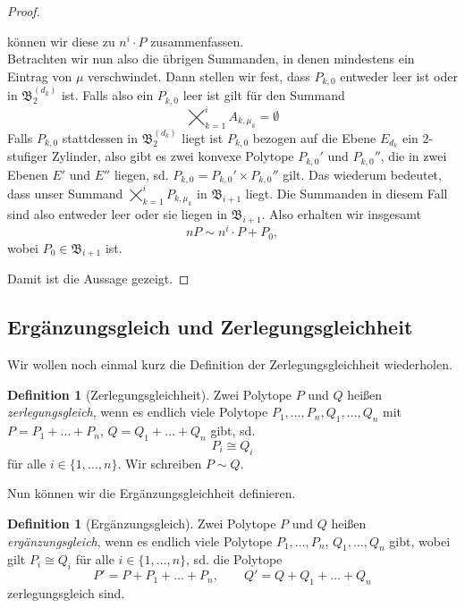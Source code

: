 \documentclass[11pt,titlepage]{article}
\theoremstyle{definition}
\newtheorem{definition}[theorem]{Definition}
\theoremstyle{remark}
\begin{document}
\begin{proof}
\begin{enumerate}
			können wir diese zu $n^i \cdot P$ zusammenfassen. \\
			Betrachten wir nun also die übrigen Summanden, in denen mindestens 
			ein Eintrag von $\mu$ verschwindet. Dann stellen wir fest, dass 
			$P_{k,0}$ entweder leer ist oder in $\mathfrak{B}_2^{(d_k)}$ ist. 
			Falls also ein $P_{k,0}$ leer ist gilt für den Summand
			\[\bigtimes_{k=1}^i A_{k,\mu_k}=\emptyset\]
			Falls $P_{k,0}$ stattdessen in $\mathfrak{B}_2^{(d_k)}$ liegt 
			ist $P_{k,0}$ bezogen auf die Ebene $E_{d_k}$ ein $2$-stufiger 
			Zylinder, also gibt es zwei konvexe Polytope $P_{k,0}'$ 
			und $P_{k,0}''$, die in zwei Ebenen $E'$ und $E''$ liegen, sd. 
			$P_{k,0}=P_{k,0}'\times P_{k,0}''$ gilt. 
			Das wiederum bedeutet, dass unser Summand 
			$\bigtimes_{k=1}^i P_{k,\mu_k}$ in $\mathfrak{B}_{i+1}$ liegt. 
			Die Summanden in diesem Fall sind also entweder leer oder sie 
			liegen in $\mathfrak{B}_{i+1}$.
			Also erhalten wir insgesamt
			\[nP\sim n^i\cdot P + P_0,\]
			wobei $P_0\in \mathfrak{B}_{i+1}$ ist.
		\end{enumerate}
		Damit ist die Aussage gezeigt.
	\end{proof}
	
	\subsection{Ergänzungsgleich und Zerlegungsgleichheit}
	
	Wir wollen noch einmal kurz die Definition der Zerlegungsgleichheit wiederholen.
	
	\begin{definition}[Zerlegungsgleichheit]
		Zwei Polytope $P$ und $Q$ heißen \textsl{zerlegungsgleich}, wenn es endlich viele Polytope 
		$P_1,\ldots,P_n,Q_1,\ldots,Q_n$ mit $P=P_1 +\ldots +P_n$,  $Q=Q_1 +\ldots+Q_n$ 
		gibt, sd. 
		\[P_i\cong Q_i\]
		für alle $i\in\{1,\ldots,n\}$. Wir schreiben $P\sim Q$.
	\end{definition}
	
	Nun können wir die Ergänzungsgleichheit definieren.
	
	\begin{definition}[Ergänzungsgleich]
		Zwei Polytope $P$ und $Q$ heißen \textsl{ergänzungsgleich}, wenn es endlich viele Polytope 
		$P_1,\ldots,P_n$, $Q_1,\ldots,Q_n$ gibt, wobei gilt $P_i\cong Q_i$ für alle $i\in\{1,\ldots,n\}$, sd. die Polytope
		\[P'=P+P_1+\ldots+P_n,\qquad Q'=Q+Q_1+\ldots+Q_n\]
		zerlegungsgleich sind.
	\end{definition}
	
\end{document}

